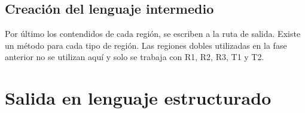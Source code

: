 



\subsection{Creación del lenguaje intermedio}

Por último los contendidos de cada región, se escriben a la ruta de salida. Existe un método para cada tipo de región. Las regiones dobles utilizadas en la fase anterior no se utilizan aquí y solo se trabaja con R1, R2, R3, T1 y T2.

\section{Salida en lenguaje estructurado}
